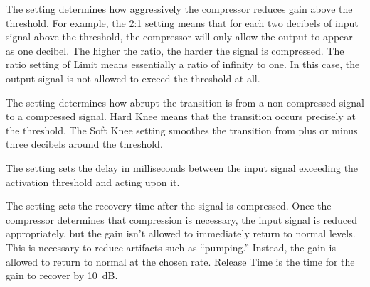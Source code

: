 The  setting determines how aggressively the compressor reduces
gain above the threshold.  For example, the 2:1 setting means that for each
two decibels of input signal above the threshold, the compressor will only
allow the output to appear as one decibel.  The higher the ratio, the harder
the signal is compressed.  The ratio setting of Limit means essentially a ratio
of infinity to one.  In this case, the output signal is not allowed to exceed
the threshold at all.

The  setting determines how abrupt the transition is from a
non-compressed signal to a compressed signal.  Hard Knee means that the
transition occurs precisely at the threshold.  The Soft Knee setting smoothes
the transition from plus or minus three decibels around the threshold.

The  setting sets the delay in milliseconds between the
input signal exceeding the activation threshold and acting upon it.

The  setting sets the recovery time after the signal is
compressed.  Once the compressor determines that compression is necessary,
the input signal is reduced appropriately, but the gain isn't allowed to
immediately return to normal levels.  This is necessary to reduce artifacts
such as ``pumping.''  Instead, the gain is allowed to return to normal at the
chosen rate.  Release Time is the time for the gain to recover by 10~dB.
